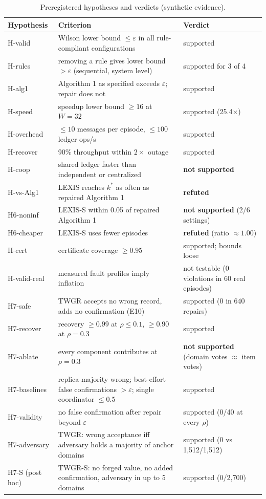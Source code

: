 \documentclass[pdflatex,sn-mathphys-num]{sn-jnl}
\theoremstyle{thmstyleone}
\theoremstyle{thmstyletwo}
\theoremstyle{thmstylethree}
\begin{document}
\begin{table}[!htbp]\centering\small
\caption{Preregistered hypotheses and verdicts (synthetic evidence).}\label{tab:verdicts}
\begin{tabularx}{\linewidth}{lX>{\raggedright\arraybackslash}p{4.0cm}}
\toprule
Hypothesis & Criterion & Verdict \\\midrule
H-valid & Wilson lower bound $\le\varepsilon$ in all rule-compliant configurations & supported \\
H-rules & removing a rule gives lower bound $>\varepsilon$ (sequential, system level) & supported for 3 of 4 \\
H-alg1 & Algorithm 1 as specified exceeds $\varepsilon$; repair does not & supported \\
H-speed & speedup lower bound $\ge16$ at $W=32$ & supported (25.4$\times$) \\
H-overhead & $\le10$ messages per episode, $\le100$ ledger ops/s & supported \\
H-recover & 90\% throughput within $2\times$ outage & supported \\
H-coop & shared ledger faster than independent or centralized & \textbf{not supported} \\
H-vs-Alg1 & LEXIS reaches $k^*$ as often as repaired Algorithm 1 & \textbf{refuted} \\
H6-noninf & LEXIS-S within 0.05 of repaired Algorithm 1 & \textbf{not supported} (2/6 settings) \\
H6-cheaper & LEXIS-S uses fewer episodes & \textbf{refuted} (ratio $\approx1.00$) \\
H-cert & certificate coverage $\ge0.95$ & supported; bounds loose \\
H-valid-real & measured fault profiles imply inflation & not testable (0 violations in 60 real episodes) \\
H7-safe & TWGR accepts no wrong record, adds no confirmation (E10) & supported (0 in 640 repairs) \\
H7-recover & recovery $\ge0.99$ at $\rho\le0.1$, $\ge0.90$ at $\rho=0.3$ & supported \\
H7-ablate & every component contributes at $\rho=0.3$ & \textbf{not supported} (domain votes $\approx$ item votes) \\
H7-baselines & replica-majority wrong; best-effort false confirmations $>\varepsilon$; single coordinator $\le0.5$ & supported \\
H7-validity & no false confirmation after repair beyond $\varepsilon$ & supported (0/40 at every $\rho$) \\
H7-adversary & TWGR: wrong acceptance iff adversary holds a majority of anchor domains & supported (0 vs 1{,}512/1{,}512) \\
H7-S (post hoc) & TWGR-S: no forged value, no added confirmation, adversary in up to 5 domains & supported (0/2{,}700) \\
\bottomrule\end{tabularx}
\end{table}
\end{document}
